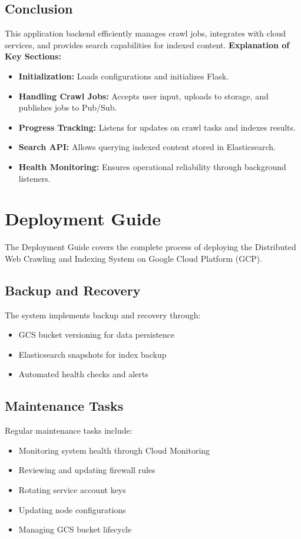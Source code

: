 \documentclass[12pt,a4paper]{report}
\begin{document}
\subsection{Conclusion}
This application backend efficiently manages crawl jobs, integrates with cloud services, and provides search capabilities for indexed content.
\textbf{Explanation of Key Sections:}
\begin{itemize}
\item \textbf{Initialization:} Loads configurations and initializes Flask.
\item \textbf{Handling Crawl Jobs:} Accepts user input, uploads to storage, and publishes jobs to Pub/Sub.
\item \textbf{Progress Tracking:} Listens for updates on crawl tasks and indexes results.
\item \textbf{Search API:} Allows querying indexed content stored in Elasticsearch.
\item \textbf{Health Monitoring:} Ensures operational reliability through background listeners.
\end{itemize}
\newpage

\section{Deployment Guide}
The Deployment Guide covers the complete process of deploying the Distributed Web Crawling and Indexing System on Google Cloud Platform (GCP).


\subsection{Backup and Recovery}
The system implements backup and recovery through:

\begin{itemize}
\item GCS bucket versioning for data persistence
\item Elasticsearch snapshots for index backup
\item Automated health checks and alerts
\end{itemize}

\subsection{Maintenance Tasks}
Regular maintenance tasks include:

\begin{itemize}
\item Monitoring system health through Cloud Monitoring
\item Reviewing and updating firewall rules
\item Rotating service account keys
\item Updating node configurations
\item Managing GCS bucket lifecycle
\end{itemize}
\end{document}
